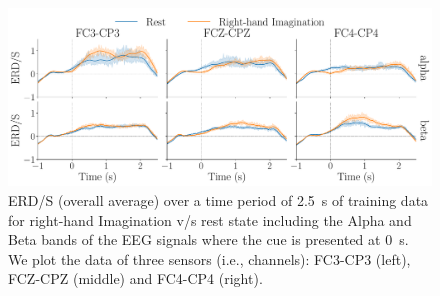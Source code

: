 \begin{figure}
\begin{center}
    \includegraphics[width=0.85\columnwidth]{braincontrol/figures/eeg_pipeline/ERDS.pdf}
    \caption{ERD/S (overall average) over a time period of \SI{2.5}{s} of training data for right-hand Imagination v/s rest state including the Alpha and Beta bands of the EEG signals  where the cue is presented at \SI{0}{s}. We plot the data of three sensors (i.e., channels): FC3-CP3 (left), FCZ-CPZ (middle) and FC4-CP4 (right).}
    \label{fig:braincontrol:ERDS}
\end{center}
\end{figure}

